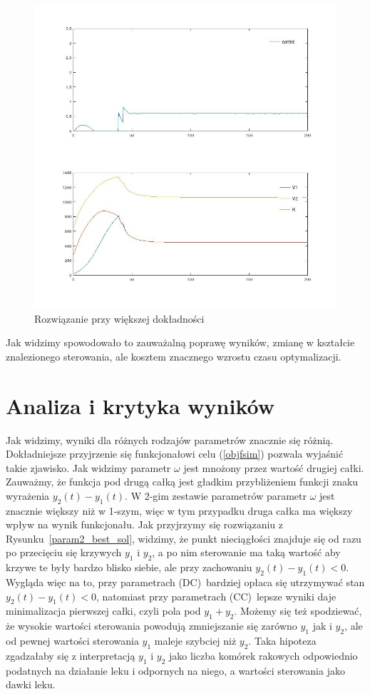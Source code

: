 \documentclass[11pt]{article}
\begin{document}
\begin{figure}[h!]
  \centering
  \includegraphics[width=.5\textwidth]{../plots/plot_new_best}
  \caption{Rozwiązanie przy większej dokładności}\label{new_best_sol}
\end{figure}

Jak widzimy spowodowało to zauważalną poprawę wyników, zmianę w kształcie znalezionego sterowania, ale kosztem znacznego wzrostu czasu optymalizacji.

\section{Analiza i krytyka wyników}

Jak widzimy, wyniki dla różnych rodzajów parametrów znacznie się różnią. Dokładniejsze przyjrzenie się funkcjonałowi celu (\ref{objfsim}) pozwala wyjaśnić takie zjawisko. Jak widzimy parametr $\omega$ jest mnożony przez wartość drugiej całki. Zauważmy, że funkcja pod drugą całką jest gładkim przybliżeniem funkcji znaku wyrażenia $y_2(t) - y_1(t)$. W 2-gim zestawie parametrów parametr $\omega$ jest znacznie większy niż w 1-szym, więc w tym przypadku druga całka ma większy wpływ na wynik funkcjonału. Jak przyjrzymy się rozwiązaniu z Rysunku~\ref{param2_best_sol}, widzimy, że punkt nieciągłości znajduje się od razu po przecięciu się krzywych $y_1$ i $y_2$, a po nim sterowanie ma taką wartość aby krzywe te były bardzo blisko siebie, ale przy zachowaniu $y_2(t) - y_1(t) < 0$. Wygląda więc na to, przy parametrach (DC)\ bardziej opłaca się utrzymywać stan $y_2(t) - y_1(t) < 0$, natomiast przy parametrach (CC)\ lepsze wyniki daje minimalizacja pierwszej całki, czyli pola pod $y_1 + y_2$. Możemy się też spodziewać, że wysokie wartości sterowania powodują zmniejszanie się zarówno $y_1$ jak i $y_2$, ale od pewnej wartości sterowania $y_1$ maleje szybciej niż $y_2$. Taka hipoteza zgadzałaby się z interpretacją $y_1$ i $y_2$ jako liczba komórek rakowych odpowiednio podatnych na działanie leku i odpornych na niego, a wartości sterowania jako dawki leku.
\end{document}
